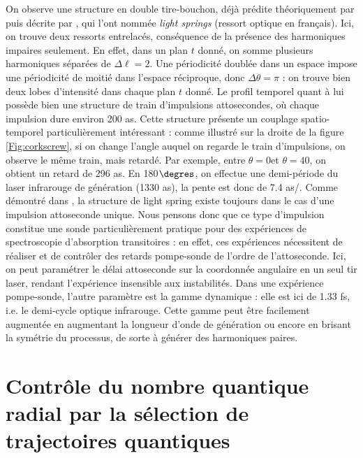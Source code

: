 On observe une structure en double tire-bouchon, déjà prédite théoriquement par  puis décrite par , qui l'ont nommée \textit{light springs} (ressort optique en français). Ici, on trouve deux ressorts entrelacés, conséquence de la présence des harmoniques impaires seulement. En effet, dans un plan $t$ donné, on somme plusieurs harmoniques séparées de $\Delta\ell = 2$. Une périodicité doublée dans un espace impose une périodicité de moitié dans l'espace réciproque, donc $\Delta\theta = \pi$ : on trouve bien deux lobes d'intensité dans chaque plan $t$ donné. Le profil temporel quant à lui possède bien une structure de train d'impulsions attosecondes, où chaque impulsion dure environ 200 as. Cette structure présente un couplage spatio-temporel particulièrement intéressant : comme illustré sur la droite de la figure \ref{Fig:corkscrew}, si on change l'angle auquel on regarde le train d'impulsions, on observe le même train, mais retardé. Par exemple, entre $\theta=0$\degres et $\theta=40$\degres, on obtient un retard de 296 as. En 180$\degres$, on effectue une demi-période du laser infrarouge de génération (1330 as), la pente est donc de 7.4 as/\degres. 
Comme démontré dans , la structure de light spring existe toujours dans le cas d'une impulsion attoseconde unique. Nous pensons donc que ce type d'impulsion constitue une sonde particulièrement pratique pour des expériences de spectroscopie d'absorption transitoires : en effet, ces expériences nécessitent de réaliser et de contrôler des retards pompe-sonde de l'ordre de l'attoseconde. Ici, on peut paramétrer le délai attoseconde sur la coordonnée angulaire en un seul tir laser, rendant l'expérience insensible aux instabilités. Dans une expérience pompe-sonde, l'autre paramètre est la gamme dynamique : elle est ici de 1.33 fs, i.e. le demi-cycle optique infrarouge. Cette gamme peut être facilement augmentée en augmentant la longueur d'onde de génération ou encore en brisant la symétrie du processus, de sorte à générer des harmoniques paires.

\chapter{Contrôle du nombre quantique radial par la sélection de trajectoires quantiques}
\label{sec:pmodes}
